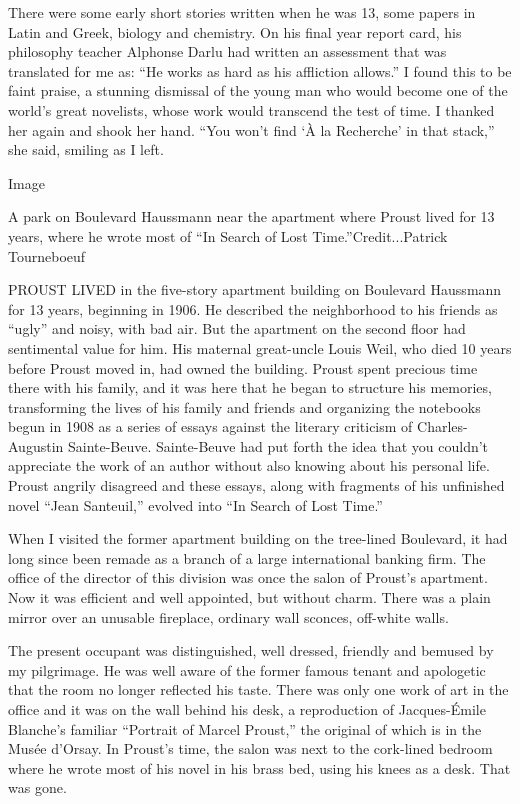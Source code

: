 There were some early short stories written when he was 13, some papers
in Latin and Greek, biology and chemistry. On his final year report
card, his philosophy teacher Alphonse Darlu had written an assessment
that was translated for me as: ``He works as hard as his affliction
allows.'' I found this to be faint praise, a stunning dismissal of the
young man who would become one of the world's great novelists, whose
work would transcend the test of time. I thanked her again and shook her
hand. ``You won't find `À la Recherche' in that stack,'' she said,
smiling as I left.

Image

A park on Boulevard Haussmann near the apartment where Proust lived for
13 years, where he wrote most of ``In Search of Lost
Time.''Credit...Patrick Tourneboeuf

PROUST LIVED in the five-story apartment building on Boulevard Haussmann
for 13 years, beginning in 1906. He described the neighborhood to his
friends as ``ugly'' and noisy, with bad air. But the apartment on the
second floor had sentimental value for him. His maternal great-uncle
Louis Weil, who died 10 years before Proust moved in, had owned the
building. Proust spent precious time there with his family, and it was
here that he began to structure his memories, transforming the lives of
his family and friends and organizing the notebooks begun in 1908 as a
series of essays against the literary criticism of Charles-Augustin
Sainte-Beuve. Sainte-Beuve had put forth the idea that you couldn't
appreciate the work of an author without also knowing about his personal
life. Proust angrily disagreed and these essays, along with fragments of
his unfinished novel ``Jean Santeuil,'' evolved into ``In Search of Lost
Time.''

When I visited the former apartment building on the tree-lined
Boulevard, it had long since been remade as a branch of a large
international banking firm. The office of the director of this division
was once the salon of Proust's apartment. Now it was efficient and well
appointed, but without charm. There was a plain mirror over an unusable
fireplace, ordinary wall sconces, off-white walls.

The present occupant was distinguished, well dressed, friendly and
bemused by my pilgrimage. He was well aware of the former famous tenant
and apologetic that the room no longer reflected his taste. There was
only one work of art in the office and it was on the wall behind his
desk, a reproduction of Jacques-Émile Blanche's familiar ``Portrait of
Marcel Proust,'' the original of which is in the Musée d'Orsay. In
Proust's time, the salon was next to the cork-lined bedroom where he
wrote most of his novel in his brass bed, using his knees as a desk.
That was gone.

